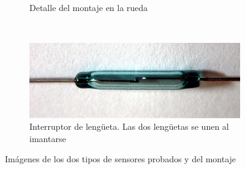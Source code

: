 \begin{figure}[!ht]
\begin{subfigure}[t]{0.4\textwidth}
		\caption{Detalle del montaje en la rueda}
		\label{fig:pasoVuelta-montaje}
	\end{subfigure}
	\\
	\begin{subfigure}[t]{0.5\textwidth}
		\centering
		\includegraphics[width=\textwidth]{images/pasoVuelta-reedSwitch}
		\caption{Interruptor de lengüeta. Las dos lengüetas se unen al
		imantarse}
		\label{fig:pasoVuelta-reedSwitch}
	\end{subfigure}

	\caption{Imágenes de los dos tipos de sensores probados y del montaje}
	\label{fig:pasoVuelta}
\end{figure}


